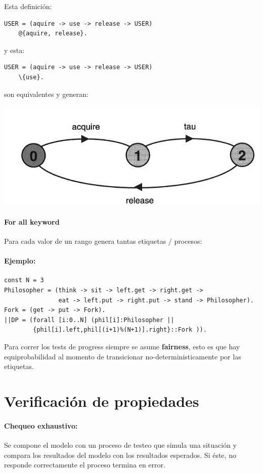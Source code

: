 Esta definición:
\begin{verbatim}
USER = (aquire -> use -> release -> USER)
    @{aquire, release}.
\end{verbatim}
y esta:
\begin{verbatim}
USER = (aquire -> use -> release -> USER)
    \{use}.
\end{verbatim}
son equivalentes y generan:
\begin{center}
\includegraphics[scale=0.5]{imagenes/lts-user}
\end{center}

\paragraph{For all keyword}
Para cada valor de un rango genera tantas etiquetas / procesos:
\paragraph{Ejemplo:}
\begin{verbatim}
const N = 3
Philosopher = (think -> sit -> left.get -> right.get ->
               eat -> left.put -> right.put -> stand -> Philosopher).
Fork = (get -> put -> Fork).
||DP = (forall [i:0..N] (phil[i]:Philosopher ||
        {phil[i].left,phil[(i+1)%(N+1)].right}::Fork )).
\end{verbatim}

Para correr los tests de progress siempre se asume \textbf{fairness}, esto es que hay equiprobabilidad al momento de transicionar no-deterministicamente por las etiquetas.

\newpage
\section{Verificación de propiedades}

\paragraph{Chequeo exhaustivo:} Se compone el modelo con un proceso de testeo que simula una situación y compara los resultados del modelo con los resultados esperados. Si éste, no responde correctamente el proceso termina en error.

